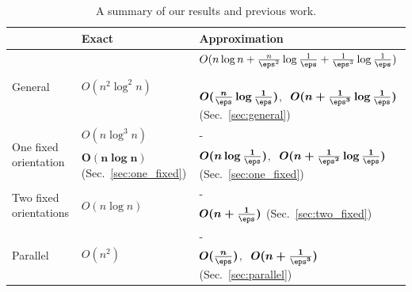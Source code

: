 










\begin{table}[t]
\begin{tabular} {p{} m{} m{}} 
\toprule
~ & \textbf{Exact} & \textbf{Approximation}  \\ 
\midrule

\multirow{2}{*}{General} & \multirow{2}{*}{$O(n^2\log^2n) $~\cite{jaromczyk1995}} & $O(n\log n + \frac{n}{\eps^2} \log \frac{1}{\eps} + \frac{1}{\eps^3}\log \frac{1}{\eps})$~\cite{agarwalTwo, chan2006faster}\\
\cmidrule(lr){3-3} 
& & 
 $\boldsymbol{O(\frac{n}{\eps} \log \frac{1}{\eps}) } $$,\:$ $\boldsymbol{O(n + \frac{1}{\eps^3} \log \frac{1}{\eps}) }$ (Sec.~\ref{sec:general}) 
\\
\cmidrule(r){1-1} \cmidrule(l){2-3} 




\multirow{2}{*}{One fixed orientation} &  $O(n  \log^3 n)$~\cite{ahn2024constrained}  & - \\
\cmidrule(lr){2-2}  \cmidrule(lr){3-3} 
& $\boldsymbol{O(n \log n)}$ (Sec.~\ref{sec:one_fixed})
& $\boldsymbol{O(n \log \frac{1}{\eps})}$$,\:$ $\boldsymbol{O(n + \frac{1}{\eps^2} \log \frac{1}{\eps}) }$  (Sec.~\ref{sec:one_fixed})   \\
\cmidrule(r){1-1} \cmidrule(l){2-3} 

\multirow{2}{*}{Two fixed orientations} & \multirow{2}{*}{$O(n \log n)$~\cite{ahn2024constrained} } & - \\
\cmidrule(lr){3-3} 
& & 
$\boldsymbol{O(n + \frac{1}{\eps})}$  (Sec.~\ref{sec:two_fixed})  \\
\cmidrule(r){1-1} \cmidrule(l){2-3} 

\multirow{2}{*}{Parallel} & \multirow{2}{*}{$O(n^2)$~\cite{bae2020minimum}} & - \\
\cmidrule(lr){3-3} 
& & 
 $\boldsymbol{O(\frac{n}{\eps})}$$,\:$  $\boldsymbol{O(n + \frac{1}{\eps^3})}$ (Sec.~\ref{sec:parallel})  \\
\bottomrule
\end{tabular}
\caption{A summary of our results and previous work.}
\label{table:result}
\end{table}



